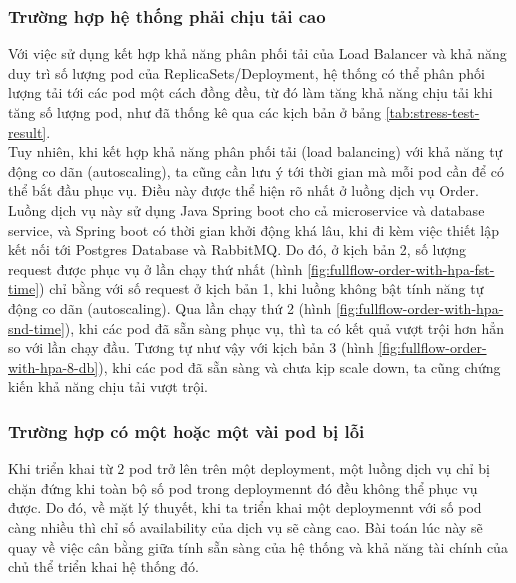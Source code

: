 \subsubsection{Trường hợp hệ thống phải chịu tải cao}
\noindent Với việc sử dụng kết hợp khả năng phân phối tải của Load Balancer và khả năng duy trì số lượng pod của ReplicaSets/Deployment, hệ thống có thể phân phối lượng tải tới các pod một cách đồng đều, từ đó làm tăng khả năng chịu tải khi tăng số lượng pod, như đã thống kê qua các kịch bản ở bảng \ref{tab:stress-test-result}.\\[0.5cm]
Tuy nhiên, khi kết hợp khả năng phân phối tải (load balancing) với khả năng tự động co dãn (autoscaling), ta cũng cần lưu ý tới thời gian mà mỗi pod cần để có thể bắt đầu phục vụ. Điều này được thể hiện rõ nhất ở luồng dịch vụ Order. Luồng dịch vụ này sử dụng Java Spring boot cho cả microservice và database service, và Spring boot có thời gian khởi động khá lâu, khi đi kèm việc thiết lập kết nối tới Postgres Database và RabbitMQ. Do đó, ở kịch bản 2, số lượng request được phục vụ ở lần chạy thứ nhất (hình \ref{fig:fullflow-order-with-hpa-fst-time}) chỉ bằng với số request ở kịch bản 1, khi luồng không bật tính năng tự động co dãn (autoscaling). Qua lần chạy thứ 2 (hình \ref{fig:fullflow-order-with-hpa-snd-time}), khi các pod đã sẵn sàng phục vụ, thì ta có kết quả vượt trội hơn hẳn so với lần chạy đầu. Tương tự như vậy với kịch bản 3 (hình \ref{fig:fullflow-order-with-hpa-8-db}), khi các pod đã sẵn sàng và chưa kịp scale down, ta cũng chứng kiến khả năng chịu tải vượt trội.
\subsubsection{Trường hợp có một hoặc một vài pod bị lỗi}
\noindent Khi triển khai từ 2 pod trở lên trên một deployment, một luồng dịch vụ chỉ bị chặn đứng khi toàn bộ số pod trong deploymennt đó đều không thể phục vụ được. Do đó, về mặt lý thuyết, khi ta triển khai một deploymennt với số pod càng nhiều thì chỉ số availability của dịch vụ sẽ càng cao. Bài toán lúc này sẽ quay về việc cân bằng giữa tính sẵn sàng của hệ thống và khả năng tài chính của chủ thể triển khai hệ thống đó.
